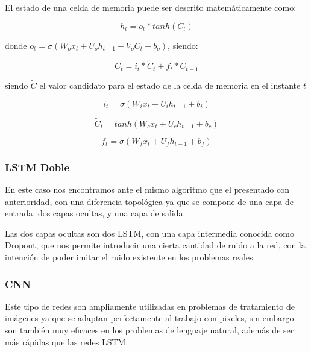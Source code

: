 El estado de una celda de memoria puede ser descrito matemáticamente como:

\begin{equation}
h_t = o_t*tanh(C_t)
\end{equation}

donde \(o_t = \sigma(W_ox_t + U_oh_{t-1} + V_oC_t + b_o)\), siendo:

\begin{equation}
C_t = i_t * \widetilde{C}_t + f_t*C_{t-1}
\end{equation}

siendo \(\widetilde{C}\) el valor candidato para el estado de la celda de memoria en el instante \(t\)

\begin{equation}
i_t = \sigma(W_ix_t + U_ih_{t-1} + b_i)
\end{equation}

\begin{equation}
\widetilde{C}_t = tanh(W_cx_t + U_ch_{t-1} + b_c)
\end{equation}

\begin{equation}
f_t = \sigma(W_fx_t + U_fh_{t-1} + b_f)
\end{equation}




\subsubsection{LSTM Doble}

En este caso nos encontramos ante el mismo algoritmo que el presentado con anterioridad, con una diferencia topológica ya que se compone de una capa de entrada, dos capas ocultas, y una capa de salida.

Las dos capas ocultas son dos LSTM, con una capa intermedia conocida como Dropout, que nos permite introducir una cierta cantidad de ruido a la red, con la intención de poder imitar el ruido existente en los problemas reales.

\subsubsection{CNN}

Este tipo de redes son ampliamente utilizadas en problemas de tratamiento de imágenes ya que se adaptan perfectamente al trabajo con pixeles, sin embargo son también muy eficaces en los problemas de lenguaje natural, además de ser más rápidas que las redes LSTM.

